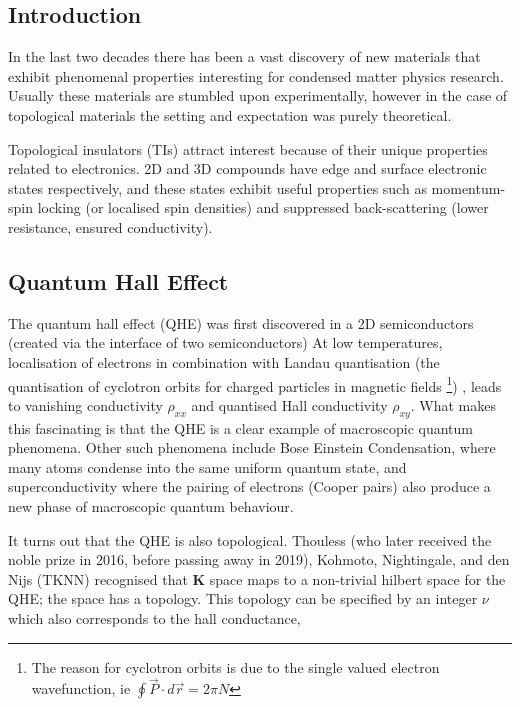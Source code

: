 

\subsection{Introduction}
In the last two decades there has been a vast discovery of new materials that exhibit phenomenal properties interesting for condensed matter physics research. Usually these materials are stumbled upon experimentally, however in the case of topological materials the setting and expectation was purely theoretical.

Topological insulators (TIs) attract interest because of their unique properties related to electronics. 2D and 3D compounds have edge and surface electronic states respectively, and these states exhibit useful properties such as momentum-spin locking (or localised spin densities) and suppressed back-scattering (lower resistance, ensured conductivity).


\subsection{Quantum Hall Effect}\label{sec:QHE}

The quantum hall effect (QHE) was first discovered in a 2D semiconductors (created via the interface of two semiconductors) %
At low temperatures, localisation of electrons in combination with Landau quantisation (the quantisation of cyclotron orbits for charged particles in magnetic fields \footnote{The reason for cyclotron orbits is due to the single valued electron wavefunction, ie $\oint \vec{P}\cdot d\vec{r} = 2\pi N$}) , leads to vanishing conductivity $\rho_{xx}$ and quantised Hall conductivity $\rho_{xy}$.  %
What makes this fascinating is that the QHE is a clear example of macroscopic quantum phenomena. Other such phenomena include Bose Einstein Condensation, where many atoms condense into the same uniform quantum state, and superconductivity where the pairing of electrons (Cooper pairs) also produce a new phase of macroscopic quantum behaviour. %

It turns out that the QHE is also topological. Thouless (who later received the noble prize in 2016, before passing away in 2019), Kohmoto, Nightingale, and den Nijs (TKNN) recognised that \textbf{K} space maps to a non-trivial hilbert space for the QHE; the space has a topology. This topology can be specified by an integer $\nu$ which also corresponds to the hall conductance, 

